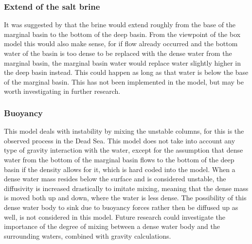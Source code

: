 \documentclass[twocolumn]{article}
\begin{document}






\subsubsection{Extend of the salt brine}
It was suggested by \cite{garcia2018geochemical} that the brine would extend roughly from the base of the marginal basin to the bottom of the deep basin. From the viewpoint of the box model this would also make sense, for if flow already occurred and the bottom water of the basin is too dense to be replaced with the dense water from the marginal basin, the marginal basin water would replace water slightly higher in the deep basin instead. This could happen as long as that water is below the base of the marginal basin. This has not been implemented in the model, but may be worth investigating in further research.

\subsubsection{Buoyancy}
This model deals with instability by mixing the unstable columns, for this is the observed process in the Dead Sea. This model does not take into account any type of gravity interaction with the water, except for the assumption that dense water from the bottom of the marginal basin flows to the bottom of the deep basin if the density allows for it, which is hard coded into the model. When a dense water mass resides below the surface and is considered unstable, the diffusivity is increased drastically to imitate mixing, meaning that the dense mass is moved both up and down, where the water is less dense. The possibility of this dense water body to sink due to buoyancy forces rather then be diffused up as well, is not considered in this model. Future research could investigate the  importance of the degree of mixing between a dense water body and the surrounding waters, combined with gravity calculations. %
\end{document}
